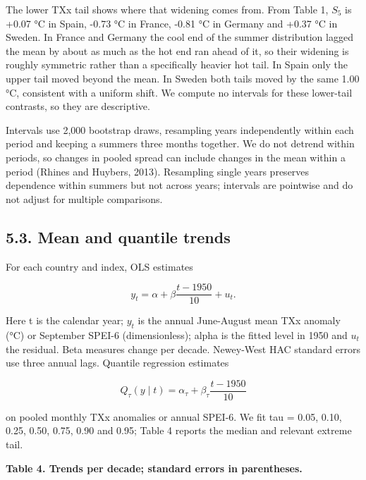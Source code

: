 \documentclass[
  10pt,
]{article}
\begin{document}
The lower TXx tail shows where that widening comes from. From Table 1,
\(S_{5}\) is +0.07 °C in Spain, -0.73 °C in France, -0.81 °C in Germany
and +0.37 °C in Sweden. In France and Germany the cool end of the summer
distribution lagged the mean by about as much as the hot end ran ahead
of it, so their widening is roughly symmetric rather than a specifically
heavier hot tail. In Spain only the upper tail moved beyond the mean. In
Sweden both tails moved by the same 1.00 °C, consistent with a uniform
shift. We compute no intervals for these lower-tail contrasts, so they
are descriptive.

Intervals use 2,000 bootstrap draws, resampling years independently
within each period and keeping a summer\textquotesingle s three months
together. We do not detrend within periods, so changes in pooled spread
can include changes in the mean within a period (Rhines and Huybers,
2013). Resampling single years preserves dependence within summers but
not across years; intervals are pointwise and do not adjust for
multiple comparisons.

\subsection{5.3. Mean and quantile
trends}\label{mean-and-quantile-trends}

For each country and index, OLS estimates

\[y_{t} = \alpha + \beta\frac{t - 1950}{10} + u_{t}.\]

Here t is the calendar year; \(y_t\) is the annual June-August mean TXx
anomaly (°C) or September SPEI-6 (dimensionless); alpha is the fitted
level in 1950 and \(u_t\) the residual. Beta measures change per decade.
Newey-West HAC standard errors use three annual lags. Quantile
regression estimates

\[Q_{\tau}(y \mid t) = \alpha_{\tau} + \beta_{\tau}\frac{t - 1950}{10}\]

on pooled monthly TXx anomalies or annual SPEI-6. We fit tau = 0.05,
0.10, 0.25, 0.50, 0.75, 0.90 and 0.95; Table 4 reports the median and
relevant extreme tail.

\textbf{Table 4. Trends per decade; standard errors in parentheses.}
\end{document}

